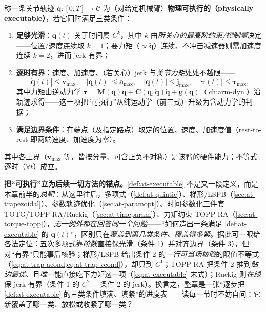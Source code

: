 \begin{definition}[物理可执行轨迹]\label{def:at-executable}
称一条关节轨迹 $\mathbf{q}:[0,T]\to\mathcal{C}$ 为（对给定机械臂）\textbf{物理可执行的（physically executable）}，若它同时满足三类条件：
\begin{enumerate}
  \item \textbf{足够光滑}：$\mathbf{q}(t)$ 关于时间属 $C^k$，其中 $k$ 由\emph{所关心的最高阶约束/控制量}决定——位置/速度连续取 $k\!=\!1$；要力矩（$\propto\ddot{\mathbf{q}}$）连续、不冲击减速器则需加速度连续 $k\!=\!2$，进而 jerk 有界；
  \item \textbf{逐时有界}：速度、加速度、（若关心）jerk 与\emph{关节力矩}处处不越限——
  \begin{equation}
    |\dot{\mathbf{q}}(t)|\le\mathbf{v}_{\max},\quad
    |\ddot{\mathbf{q}}(t)|\le\mathbf{a}_{\max},\quad
    |\dddot{\mathbf{q}}(t)|\le\mathbf{j}_{\max},\quad
    |\boldsymbol{\tau}(t)|\le\boldsymbol{\tau}_{\max},
    \label{eq:at-executable}
  \end{equation}
  其中力矩由逆动力学 $\boldsymbol{\tau}=\mathbf{M}(\mathbf{q})\ddot{\mathbf{q}}+\mathbf{C}(\mathbf{q},\dot{\mathbf{q}})\dot{\mathbf{q}}+\mathbf{g}(\mathbf{q})$（\cref{ch:arm-dyn}）沿轨迹求得——这一项把“可执行”从纯运动学（前三式）升级为含动力学的判据；
  \item \textbf{满足边界条件}：在端点（及指定路点）取定的位置、速度、加速度值（rest-to-rest 即两端速度、加速度为零）。
\end{enumerate}
其中各上界（$\mathbf{v}_{\max}$ 等，皆按分量、可含正负不对称）是该臂的硬件能力；不等式逐时（$\forall t$）成立。
\end{definition}

\begin{insight}
\textbf{把“可执行”立为后续一切方法的锚点。}\;\cref{def:at-executable} 不是又一段定义，而是本章前半的\emph{总靶}：从这里往后，多项式（\cref{def:at-quintic}）、梯形/LSPB（\cref{sec:at-trapezoidal}）、参数轨迹优化（\cref{sec:at-paramopt}）、时间参数化三件套 TOTG/TOPP-RA/Ruckig（\cref{sec:at-timeparam}）、力矩约束 TOPP-RA（\cref{sec:at-torque-topp}），\emph{无一例外都在回答同一个问题}——“如何造出一条满足 \cref{def:at-executable} 的 $\mathbf{q}(t)$”，区别只在\emph{覆盖到第几类条件、覆盖得多紧}。据此可一眼给各法定位：五次多项式靠\emph{阶数}直接保光滑（条件 1）并对齐边界（条件 3），但对“有界”只能事后核验；梯形/LSPB 给出条件 2 的\emph{一行可当场核验}的限值不等式（\cref{eq:at-trap-acond,eq:at-trap-vcond}），却只到 $C^1$；TOPP-RA 把条件 2 推到\emph{贴边最优}、且\emph{唯一}能直接吃下力矩这一项（\cref{eq:at-executable} 末式）；Ruckig 则\emph{在线}保 jerk 有界（条件 1 的 $C^2$ + 条件 2 的 jerk）。换言之，整章是一张“逐步把 \cref{def:at-executable} 的三类条件填满、填紧”的进度表——读每一节时不妨自问：它新覆盖了哪一类、放松或收紧了哪一类？
\end{insight}

